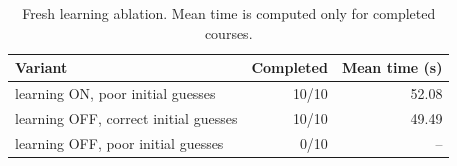 \begin{table}[ht]\centering\small

\begin{tabularx}{\textwidth}{@{}Yrr@{}}\toprule

Variant & Completed & Mean time (s)\\\midrule

learning ON,  poor initial guesses & 10/10 & 52.08\\

learning OFF, correct initial guesses & 10/10 & 49.49\\

learning OFF, poor initial guesses & 0/10 & --\\

\bottomrule\end{tabularx}

\caption{Fresh learning ablation. Mean time is computed only for completed courses.}\label{tab:ablation}\end{table}